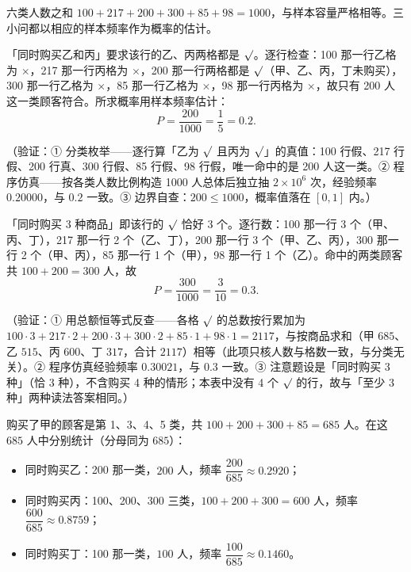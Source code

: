 \begin{answer}
六类人数之和 \(100+217+200+300+85+98=1000\)，与样本容量严格相等。三小问都以相应的样本频率作为概率的估计。


「同时购买乙和丙」要求该行的乙、丙两格都是 \(\surd\)。逐行检查：100 那一行乙格为 \(\times\)，217 那一行丙格为 \(\times\)，200 那一行两格都是 \(\surd\)（甲、乙、丙，丁未购买），300 那一行乙格为 \(\times\)，85 那一行乙格为 \(\times\)，98 那一行丙格为 \(\times\)，故只有 200 人这一类顾客符合。所求概率用样本频率估计：
\nopagebreak[4]
\[
P=\frac{200}{1000}=\frac{1}{5}=0.2 .
\]

（验证：① 分类枚举——逐行算「乙为 \(\surd\) 且丙为 \(\surd\)」的真值：100 行假、217 行假、200 行真、300 行假、85 行假、98 行假，唯一命中的是 200 人这一类。② 程序仿真——按各类人数比例构造 1000 人总体后独立抽 \(2\times10^{6}\) 次，经验频率 \(0.20000\)，与 \(0.2\) 一致。③ 边界自查：\(200\leqslant1000\)，概率值落在 \([0,1]\) 内。）


「同时购买 3 种商品」即该行的 \(\surd\) 恰好 3 个。逐行数：100 那一行 3 个（甲、丙、丁），217 那一行 2 个（乙、丁），200 那一行 3 个（甲、乙、丙），300 那一行 2 个（甲、丙），85 那一行 1 个（甲），98 那一行 1 个（乙）。命中的两类顾客共 \(100+200=300\) 人，故
\nopagebreak[4]
\[
P=\frac{300}{1000}=\frac{3}{10}=0.3 .
\]

（验证：① 用总额恒等式反查——各格 \(\surd\) 的总数按行累加为 \(100\cdot3+217\cdot2+200\cdot3+300\cdot2+85\cdot1+98\cdot1=2117\)，与按商品求和（甲 \(685\)、乙 \(515\)、丙 \(600\)、丁 \(317\)，合计 \(2117\)）相等（此项只核人数与格数一致，与分类无关）。② 程序仿真经验频率 \(0.30021\)，与 \(0.3\) 一致。③ 注意题设是「同时购买 3 种」（恰 3 种），不含购买 4 种的情形；本表中没有 4 个 \(\surd\) 的行，故与「至少 3 种」两种读法答案相同。）


购买了甲的顾客是第 1、3、4、5 类，共 \(100+200+300+85=685\) 人。在这 \(685\) 人中分别统计（分母同为 \(685\)）：

\begin{itemize}
\item 同时购买乙：200 那一类，\(200\) 人，频率 \(\dfrac{200}{685}\approx0.2920\)；
\item 同时购买丙：100、200、300 三类，\(100+200+300=600\) 人，频率 \(\dfrac{600}{685}\approx0.8759\)；
\item 同时购买丁：100 那一类，\(100\) 人，频率 \(\dfrac{100}{685}\approx0.1460\)。
\end{itemize}


\end{answer}
